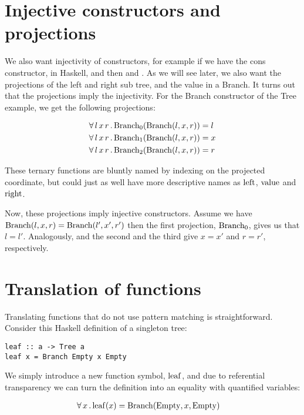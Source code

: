 \section{Injective constructors and projections}

We also want injectivity of constructors, for example if we have the
cons constructor, \hs{:} in Haskell, and  then
 and . As we will see later, we also want the
projections of the left and right sub tree, and the value in a Branch.
It turns out that the projections imply the injectivity. For the Branch
constructor of the Tree example, we get the following projections:

\begin{align*}
 \forall \, l \, x \, r \, . \,  \mathrm{Branch_{0}}(\mathrm{Branch}(l,x,r)) &  = l\\
 \forall \, l \, x \, r \, . \,  \mathrm{Branch_{1}}(\mathrm{Branch}(l,x,r)) &  = x\\
 \forall \, l \, x \, r \, . \,  \mathrm{Branch_{2}}(\mathrm{Branch}(l,x,r)) &  = r
\end{align*}

These ternary functions are bluntly named by indexing on the projected
coordinate, but could just as well have more descriptive names as
$\mathrm{left}$, $\mathrm{value}$ and $\mathrm{right}$.

Now, these projections imply injective constructors. Assume we have
$\mathrm{Branch}(l,x,r) = \mathrm{Branch}(l',x',r')$ then the first
projection, $\mathrm{Branch_0}$, gives us that $l=l'$. Analogously,
and the second and the third give $x=x'$ and $r=r'$, respectively.

\section{Translation of functions}

Translating functions that do not use pattern matching is
straightforward. Consider this Haskell definition of a singleton tree:

\begin{verbatim}
leaf :: a -> Tree a
leaf x = Branch Empty x Empty
\end{verbatim}

We simply introduce a new function symbol, $\mathrm{leaf}$, and due
to referential transparency we can turn the definition into an
equality with quantified variables:

\begin{align*}
 \forall \, x \, . \, \mathrm{leaf}(x) &  = \mathrm{Branch}(\mathrm{Empty},x,\mathrm{Empty})
\end{align*}

